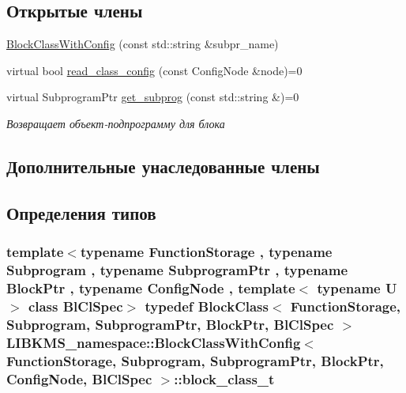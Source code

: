 \subsection*{Открытые члены}
\begin{DoxyCompactItemize}
\item 
\hyperlink{structLIBKMS__namespace_1_1BlockClassWithConfig_a11cb32afa530052b1fbf4d56cd5610be}{Block\-Class\-With\-Config} (const std\-::string \&subpr\-\_\-name)
\item 
virtual bool \hyperlink{structLIBKMS__namespace_1_1BlockClassWithConfig_a16930c27678eb0887854d6c83f38f301}{read\-\_\-class\-\_\-config} (const Config\-Node \&node)=0
\item 
virtual Subprogram\-Ptr \hyperlink{structLIBKMS__namespace_1_1BlockClassWithConfig_af747a8a47b472e9ef2e8a45ab925c4f1}{get\-\_\-subprog} (const std\-::string \&)=0
\begin{DoxyCompactList}\small\item\em Возвращает объект-\/подпрограмму для блока \end{DoxyCompactList}\end{DoxyCompactItemize}
\subsection*{Дополнительные унаследованные члены}


\subsection{Определения типов}
\hypertarget{structLIBKMS__namespace_1_1BlockClassWithConfig_a9a90d09b791c08682e6bc111072d87de}{
\subsubsection[{block\-\_\-class\-\_\-t}]{\setlength{\rightskip}{0pt plus 5cm}template$<$typename Function\-Storage , typename Subprogram , typename Subprogram\-Ptr , typename Block\-Ptr , typename Config\-Node , template$<$ typename U $>$ class Bl\-Cl\-Spec$>$ typedef {\bf Block\-Class}$<$ {\bf Function\-Storage}, {\bf Subprogram}, Subprogram\-Ptr, Block\-Ptr, Bl\-Cl\-Spec $>$ {\bf L\-I\-B\-K\-M\-S\-\_\-namespace\-::\-Block\-Class\-With\-Config}$<$ {\bf Function\-Storage}, {\bf Subprogram}, Subprogram\-Ptr, Block\-Ptr, Config\-Node, Bl\-Cl\-Spec $>$\-::{\bf block\-\_\-class\-\_\-t}}}\label{structLIBKMS__namespace_1_1BlockClassWithConfig_a9a90d09b791c08682e6bc111072d87de}


